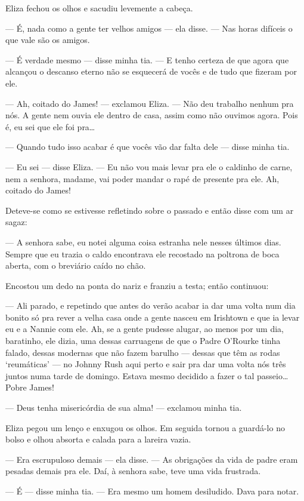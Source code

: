 Eliza fechou os olhos e sacudiu levemente a cabeça.

--- É, nada como a gente ter velhos amigos --- ela disse. --- Nas
horas difíceis o que vale são os amigos.

--- É verdade mesmo --- disse minha tia. --- E tenho certeza de que
agora que alcançou o descanso eterno não se esquecerá de vocês e de
tudo que fizeram por ele.

--- Ah, coitado do James! --- exclamou Eliza. --- Não deu trabalho
nenhum pra nós. A gente nem ouvia ele dentro de casa, assim como não
ouvimos agora. Pois é, eu sei que ele foi pra\ldots{}

--- Quando tudo isso acabar é que vocês vão dar falta dele --- disse
minha tia.

--- Eu sei --- disse Eliza. --- Eu não vou mais levar pra ele o
caldinho de carne, nem a senhora, madame, vai poder mandar o rapé de
presente pra ele. Ah, coitado do James!

Deteve-se como se estivesse refletindo sobre o passado e então disse
com um ar sagaz:

--- A senhora sabe, eu notei alguma coisa estranha nele nesses últimos
dias. Sempre que eu trazia o caldo encontrava ele recostado na
poltrona de boca aberta, com o breviário caído no chão.

Encostou um dedo na ponta do nariz e franziu a testa; então continuou:

--- Ali parado, e repetindo que antes do verão acabar ia dar uma volta
num dia bonito só pra rever a velha casa onde a gente nasceu em
Irishtown e que ia levar eu e a Nannie com ele. Ah, se a gente pudesse
alugar, ao menos por um dia, baratinho, ele dizia, uma dessas
carruagens de que o Padre O'Rourke tinha falado, dessas modernas que
não fazem barulho --- dessas que têm as rodas `reumáticas' --- no
Johnny Rush aqui perto e sair pra dar uma volta nós três juntos numa
tarde de domingo. Estava mesmo decidido a fazer o tal passeio\ldots{} Pobre
James!

--- Deus tenha misericórdia de sua alma! --- exclamou minha tia.

Eliza pegou um lenço e enxugou os olhos. Em seguida tornou a guardá-lo
no bolso e olhou absorta e calada para a lareira vazia.

--- Era escrupuloso demais --- ela disse. --- As obrigações da vida de
padre eram pesadas demais pra ele. Daí, à senhora sabe, teve uma vida
frustrada.

--- É --- disse minha tia. --- Era mesmo um homem desiludido. Dava
para notar.

